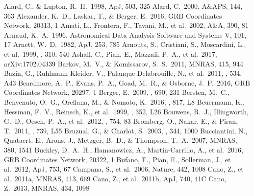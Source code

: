 \documentclass[traditabstract,longauth]{aa}
\begin{document}
\begin{thebibliography}{99}
 Alard, C., \& Lupton, R.~H.\ 1998, ApJ, 503, 325 
 Alard, C.\ 2000, A\&APS, 144, 363 
 Alexander, K.~D., Laskar, T., \& Berger, E.\ 2016, GRB Coordinates Network, 20313, 1 
 Amati, L., Frontera, F., Tavani, M., et al.\ 2002, A\&A, 390, 81 
 Arnaud, K.~A.\ 1996, Astronomical Data Analysis Software and Systems V, 101, 17 
 Arnett, W.~D.\ 1982, ApJ, 253, 785 
 Arnouts, S., Cristiani, S., Moscardini, L., et al.\ 1999, \mnras, 310, 540 
 Ashall, C., Pian, E., Mazzali, P.~A., et al.\ 2017, arXiv:1702.04339 
 Barkov, M.~V., \& Komissarov, S.~S.\ 2011, MNRAS, 415, 944 
 Bazin, G., Ruhlmann-Kleider, V., Palanque-Delabrouille, N., et al.\ 2011, \aap, 534, A43 
 Beardmore, A.~P., Evans, P.~A., Goad, M.~R., \& Osborne, J.~P.\ 2016, GRB Coordinates Network, 20297, 1 
 Berger, E.\ 2009, \apj, 690, 231 
 Bersten, M.~C., Benvenuto, O.~G., Orellana, M., \& Nomoto, K.\ 2016, \apjl, 817, L8 
 Beuermann, K., Hessman, F.~V., Reinsch, K., et al.\ 1999, \aap, 352, L26 
 Bouwens, R.~J., Illingworth, G.~D., Oesch, P.~A., et al.\ 2012, \apj, 754, 83 
 Bromberg, O., Nakar, E., \& Piran, T.\ 2011, \apjl, 739, L55 
 Bruzual, G., \& Charlot, S.\ 2003, \mnras, 344, 1000 
 Bucciantini, N., Quataert, E., Arons, J., Metzger, B.~D., \& Thompson, T.~A.\ 2007, MNRAS, 380, 1541 
 Buckley, D.~A.~H., Hamanowicz, A., Martin-Carrillo, A., et al.\ 2016, GRB Coordinates Network, 20322, 1 
 Bufano, F., Pian, E., Sollerman, J., et al.\ 2012, ApJ, 753, 67 
 Campana, S., et al.\ 2006, Nature, 442, 1008
 Cano, Z., et al.\ 2011a, MNRAS, 413, 669
 Cano, Z., et al.\ 2011b, ApJ, 740, 41C
 Cano, Z.\ 2013, MNRAS, 434, 1098 

\end{thebibliography}
\end{document}
